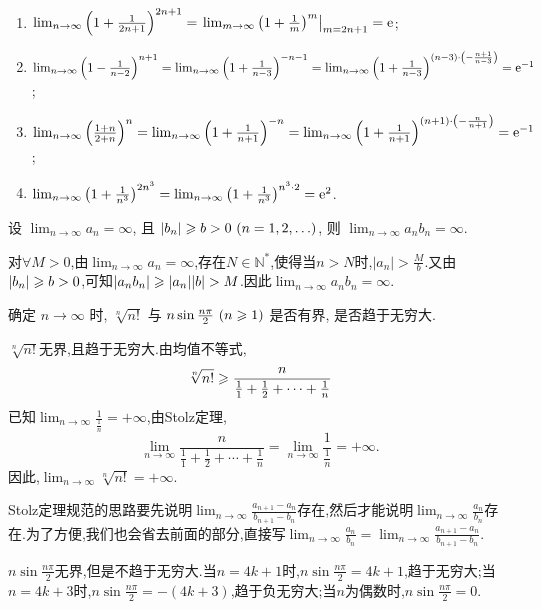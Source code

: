 \begin{solution}
    \begin{enumerate}[(1)]
        \item $\lim_{n\to\infty} \left(1 + \frac{1}{2n+1}\right)^{2n+1} = \left. \lim_{m\to\infty} \left(1 + \frac{1}{m}\right)^m \right|_{m=2n+1} = \mathrm{e}$;
        \item $\lim_{n\to\infty} \left(1 - \frac{1}{n-2}\right)^{n+1}  = \lim_{n\to\infty} \left(1+\frac{1}{n-3}\right)^{-n-1} =\lim_{n\to\infty} \left(1+\frac{1}{n-3}\right)^{(n-3)\cdot\left(-\frac{n+1}{n-3}\right)} =\mathrm{e}^{-1} $;
        \item $\lim_{n\to\infty} \left(\frac{1+n}{2+n}\right)^{n}=\lim_{n\to\infty} \left(1 + \frac{1}{n+1} \right)^{-n}=\lim_{n\to\infty} \left(1 + \frac{1}{n+1} \right)^{(n+1)\cdot\left(-\frac{n}{n+1}\right)} = \mathrm{e}^{-1}$;
        \item $\lim_{n\to\infty} \left(1 + \frac{1}{n^3}\right)^{2n^3}=\lim_{n\to\infty} \left(1 + \frac{1}{n^3}\right)^{n^3 \cdot 2} = \mathrm{e}^2$.
    \end{enumerate}
\end{solution}

\begin{exercise}[1.2.23]
    设 $\lim_{n\to\infty} a_n = \infty$, 且 $|b_n| \geqslant b > 0 \ (n=1, 2, \ldots)$, 则 $\lim_{n\to\infty} a_n b_n = \infty$.
\end{exercise}

\begin{solution}
    对$\forall M > 0$,由$\lim_{n\to\infty} a_n = \infty$,存在$N\in \mathbb{N}^*$,使得当$n>N$时,$|a_n |> \frac{M}{b}$.又由$|b_n| \geqslant b > 0$,可知$|a_n b_n| \geqslant |a_n| |b| > M$.因此$\lim_{n\to\infty} a_n b_n = \infty$.
\end{solution}

\begin{exercise}[1.2.24]
    确定 $n \to \infty$ 时, $\sqrt[n]{n!}$ 与 $n \sin \frac{n \pi}{2} \ (n \geqslant 1)$ 是否有界, 是否趋于无穷大.
\end{exercise}

\begin{solution}
    $\sqrt[n]{n!}$无界,且趋于无穷大.由均值不等式,$$\sqrt[n]{n!} \geqslant \frac{n}{\frac{1}{1} + \frac{1}{2} + \cdots + \frac{1}{n}}$$
    已知$\lim_{n \to \infty}  \frac{1}{\frac{1}{n}}  = +\infty$,由Stolz定理,
    $$\lim_{n \to \infty} \frac{n}{\frac{1}{1} + \frac{1}{2} + \cdots + \frac{1}{n}} 
        = \lim_{n \to \infty} \frac{1}{\frac1{n}} = +\infty.$$
    因此,$\lim_{n \to \infty} \sqrt[n]{n!} = +\infty$.

    \begin{remark}
        Stolz定理规范的思路要先说明$\lim_{n \to \infty} \frac{a_{n+1} - a_n}{b_{n+1} - b_n}$存在,然后才能说明$\lim_{n \to \infty} \frac{a_n}{b_n}$存在.为了方便,我们也会省去前面的部分,直接写$\lim_{n \to \infty} \frac{a_n}{b_n} = \lim_{n \to \infty} \frac{a_{n+1} - a_n}{b_{n+1} - b_n}$.
    \end{remark}

    $n \sin \frac{n \pi}{2}$无界,但是不趋于无穷大.当$n=4k+1$时,$n \sin \frac{n \pi}{2} = 4k+1$,趋于无穷大;当$n=4k+3$时,$n \sin \frac{n \pi}{2} = -(4k+3)$,趋于负无穷大;当$n$为偶数时,$n \sin \frac{n \pi}{2} = 0$.
\end{solution}


